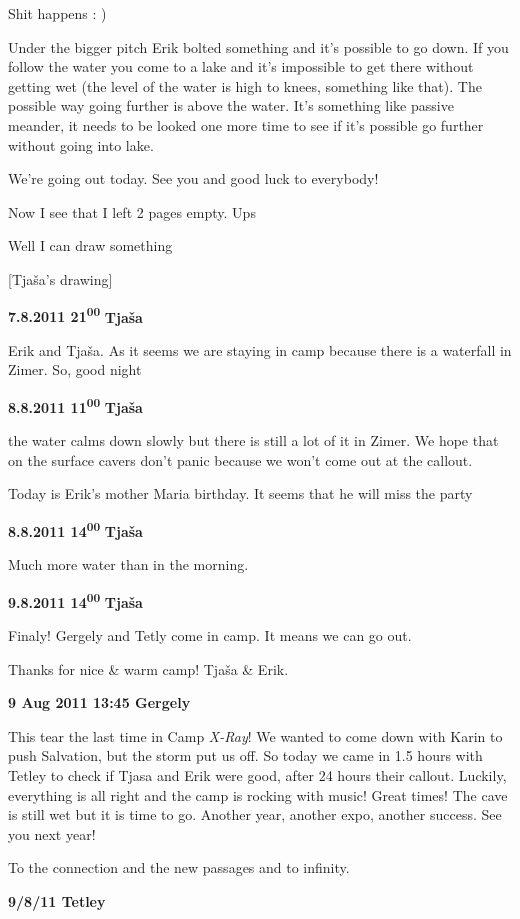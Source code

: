 Shit happens : )

Under the bigger pitch Erik bolted something and it's possible to go
down. If you follow the water you come to a lake and it's impossible to
get there without getting wet (the level of the water is high to knees,
something like that). The possible way going further is above the water.
It's something like passive meander, it needs to be looked one more time
to see if it's possible go further without going into lake.

We're going out today. See you and good luck to everybody!

Now I see that I left 2 pages empty. Ups

Well I can draw something

{[}Tjaša's drawing{]}

\textbf{7.8.2011 21\textsuperscript{00}} \textbf{Tjaša}

Erik and Tjaša. As it seems we are staying in camp because there is a
waterfall in Zimer. So, good night

\textbf{8.8.2011 11\textsuperscript{00}} \textbf{Tjaša}

the water calms down slowly but there is still a lot of it in Zimer. We
hope that on the surface cavers don't panic because we won't come out at
the callout.

Today is Erik's mother Maria birthday. It seems that he will miss the
party

\textbf{8.8.2011 14\textsuperscript{00}} \textbf{Tjaša}

Much more water than in the morning.

\textbf{9.8.2011 14\textsuperscript{00}} \textbf{Tjaša}

Finaly! Gergely and Tetly come in camp. It means we can go out.

Thanks for nice \& warm camp! Tjaša \& Erik.

\textbf{9 Aug 2011 13:45 Gergely}

This tear the last time in Camp \emph{X-Ray}! We wanted to come down
with Karin to push Salvation, but the storm put us off. So today we came
in 1.5 hours with Tetley to check if Tjasa and Erik were good, after 24
hours their callout. Luckily, everything is all right and the camp is
rocking with music! Great times! The cave is still wet but it is time to
go. Another year, another expo, another success. See you next year!

To the connection and the new passages and to infinity.

\textbf{9/8/11 Tetley}

